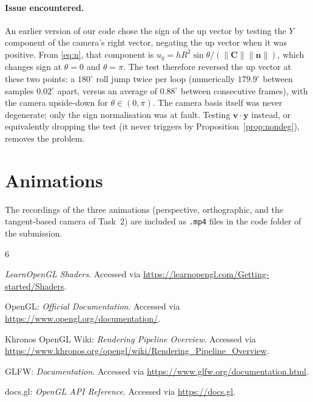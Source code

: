 \documentclass[acmlarge]{acmart}
\begin{document}
\paragraph{Issue encountered.} An earlier version of our code chose the sign of
the up vector by testing the $Y$ component of the camera's right vector, negating
the up vector when it was positive. From \cref{eq:n}, that component is
$u_y=hR^2\sin\theta/(\|\mathbf{C}\|\|\mathbf{n}\|)$, which changes sign at
$\theta=0$ and $\theta=\pi$. The test therefore reversed the up vector at these
two points: a $180^\circ$ roll jump twice per loop (numerically $179.9^\circ$
between samples $0.02^\circ$ apart, versus an average of $0.88^\circ$ between
consecutive frames), with the camera upside-down for $\theta\in(0,\pi)$. The
camera basis itself was never degenerate; only the sign normalisation was at
fault. Testing $\mathbf{v}\cdot\mathbf{y}$ instead, or equivalently dropping the
test (it never triggers by Proposition~\ref{prop:nondeg}), removes the problem.

\section{Animations}

The recordings of the three animations (perspective, orthographic, and the
tangent-based camera of Task~2) are included as \texttt{.mp4} files in the code
folder of the submission.


\begin{thebibliography}{6}

\emph{LearnOpenGL Shaders}.
\newblock Accessed via \url{https://learnopengl.com/Getting-started/Shaders}.

OpenGL: \emph{Official Documentation}.
\newblock Accessed via \url{https://www.opengl.org/documentation/}.

Khronos OpenGL Wiki: \emph{Rendering Pipeline Overview}.
\newblock Accessed via \url{https://www.khronos.org/opengl/wiki/Rendering_Pipeline_Overview}.

GLFW: \emph{Documentation}.
\newblock Accessed via \url{https://www.glfw.org/documentation.html}.

docs.gl: \emph{OpenGL API Reference}.
\newblock Accessed via \url{https://docs.gl}.

\end{thebibliography}
\end{document}
